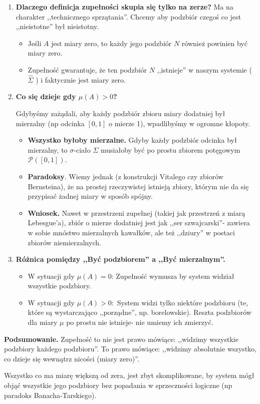 \begin{enumerate}[label=\arabic*.]
	\item \textbf{Dlaczego definicja zupełności skupia się tylko na zerze?} Ma na charakter ,,technicznego sprzątania''. Chcemy aby podzbiór czegoś co jest ,,nieistotne'' był nieistotny.
		\begin{itemize}
			\item Jeśli $A$ jest miary zero, to każdy jego podzbiór $N$ również powinien być miary zero.
			\item Zupełność gwarantuje, że ten podzbiór $N$ ,,istnieje'' w naszym systemie ($\hat{\Sigma }$ ) i faktycznie jest miary zero.
		\end{itemize}
	\item \textbf{Co się dzieje gdy $\mu\left( A \right) > 0$?}

		Gdybyśmy zażądali, aby każdy podzbiór zbioru miary dodatniej był mierzalny (np odcinka $\left[ 0,1 \right] $ o mierze 1), wpadlibyśmy w ogromne kłopoty.
		\begin{itemize}
			\item \textbf{Wszystko byłoby mierzalne.} Gdyby każdy podzbiór odcinka był mierzalny, to $\sigma $-ciało $\Sigma $ musiałoby być po prostu zbiorem potęgowym $\mathcal{P}(\left[ 0,1 \right] ) $.
			\item \textbf{Paradoksy}. Wiemy jednak (z konstrukcji Vitalego czy zbiorów Bernsteina), że na prostej rzeczywistej istnieją zbiory, którym nie da się przypisać żadnej miary w sposób spójny.
			\item \textbf{Wniosek.} Nawet w przestrzeni zupełnej (takiej jak przestrzeń z miarą Lebesgue'a), zbiór o mierze dodatniej jest jak ,,ser szwajcarski''- zawiera w sobie mnóstwo mierzalnych kawałków, ale też ,,dziury'' w postaci zbiorów niemierzalnych.  
		\end{itemize}
	\item \textbf{Różnica pomiędzy ,,Być podzbiorem'' a ,,Być mierzalnym''.} 
		\begin{itemize}
			\item W sytuacji gdy $\mu\left( A \right) = 0 $: Zupełność wymusza by system widział wszystkie podzbiory.
			\item W sytuacji gdy $\mu\left( A \right) > 0:$ System widzi tylko niektóre podzbioru (te, które są wystarczająco ,,porządne'', np. borelowskie). Reszta podzbiorów dla miary $\mu$ po prostu nie istnieje- nie umiemy ich zmierzyć.
		\end{itemize}
\end{enumerate}

\noindent \textbf{Podsumowanie.} Zupełność to nie jest prawo mówiące: ,,widzimy wszystkie podzbiory każdego podzbioru''. To prawo mówiące: ,,widzimy absolutnie wszystko, co dzieje się wewnątrz nicości (miary zero)''.

Wszystko co ma miarę większą od zera, jest zbyt skomplikowane, by system mógł objąć wszystkie jego podzbiory bez popadania w sprzeczności logiczne (np paradoks Banacha-Tarskiego).
